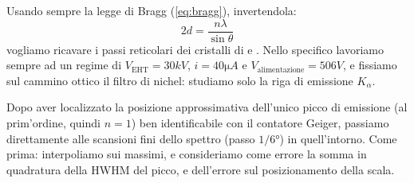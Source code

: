 
Usando sempre la legge di Bragg (\ref{eq:bragg}), invertendola:
\begin{equation}
2d = \frac{n\lambda}{\sin \theta}
\end{equation}
vogliamo ricavare i passi reticolari dei cristalli di  e .
Nello specifico lavoriamo sempre ad un regime di $ V_\text{EHT} = 30 \unit{kV} $, $ i = 40 \unit{\micro A} $ e $ V_\text{alimentazione} = 506 \unit{V} $, e fissiamo sul cammino ottico il filtro di nichel: studiamo solo la riga di emissione $ K_{\alpha} $.

Dopo aver localizzato la posizione approssimativa dell'unico picco di emissione (al prim'ordine, quindi $ n=1 $) ben identificabile con il contatore Geiger, passiamo direttamente alle scansioni fini dello spettro (passo $ 1/6 \unit{\degree} $) in quell'intorno.
Come prima: interpoliamo sui massimi, e consideriamo come errore la somma in quadratura della HWHM del picco, e dell'errore sul posizionamento della scala.


